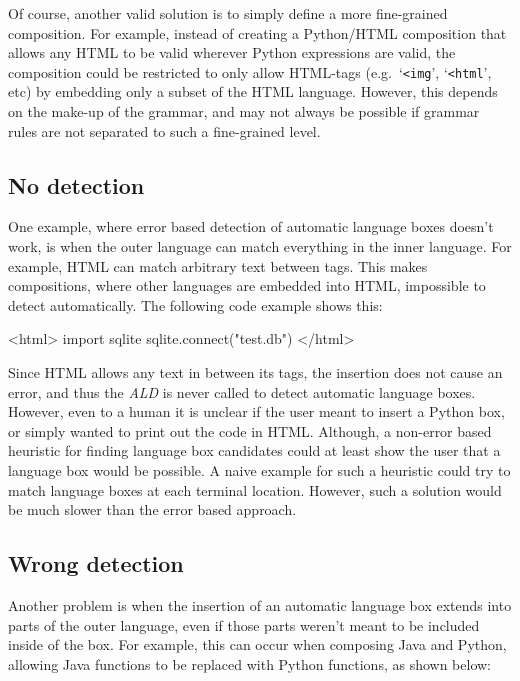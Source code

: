 \documentclass[sigplan,screen]{acmart}\settopmatter{printfolios=true,printccs=false,printacmref=false}
\newcommand{\ald}[0]{\emph{ALD}\xspace}
\newcommand{\qtt}[1]{`\texttt{#1}'\xspace}
\begin{document}
Of course, another valid solution is to simply define a more
fine-grained composition. For example, instead of creating a Python/HTML
composition that allows any HTML to be valid wherever Python expressions are
valid, the composition could be restricted to only allow HTML-tags
(e.g.~\qtt{<img}, \qtt{<html}, etc) by embedding only a subset of the HTML
language. However, this depends on the make-up of the grammar, and may not
always be possible if grammar rules are not separated to such a fine-grained
level.

\subsection{No detection}

One example, where error based detection of automatic language boxes doesn't
work, is when the outer language can match everything in the inner language.
For example, HTML can match arbitrary text between tags. This makes
compositions, where other languages are embedded into HTML, impossible to
detect automatically. The following code example shows this:

\begin{lstdefault}[language=html]
<html>
import sqlite
sqlite.connect("test.db")
</html>
\end{lstdefault}
\vspace{1em}

Since HTML allows any text in between its tags, the insertion does not cause an
error, and thus the \ald is never called to detect automatic language boxes.
However, even to a human it is unclear if the user meant to insert a Python
box, or simply wanted to print out the code in HTML. Although, a non-error
based heuristic for finding language box candidates could at least show the
user that a language box would be possible.  A naive example for such a
heuristic could try to match language boxes at each terminal location. However,
such a solution would be much slower than the error based approach.

\subsection{Wrong detection}

Another problem is when the insertion of an automatic language box extends into
parts of the outer language, even if those parts weren't meant to be included
inside of the box. For example, this can occur when composing Java and Python,
allowing Java functions to be replaced with Python functions, as shown below:
\end{document}
